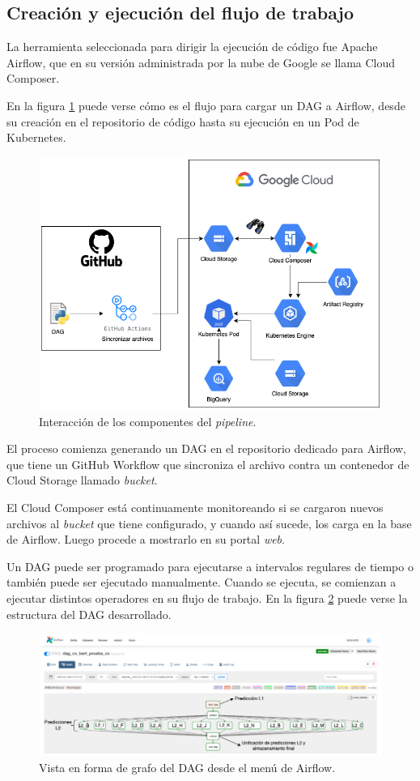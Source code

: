 \subsection{Creación y ejecución del flujo de trabajo}

La herramienta seleccionada para dirigir la ejecución de código fue Apache Airflow, que en su versión administrada por la nube de Google se llama Cloud Composer.

En la figura \ref{fig:cap3-pipeline} puede verse cómo es el flujo para cargar un DAG a Airflow, desde su creación en el repositorio de código hasta su ejecución en un Pod de Kubernetes.

\begin{figure}[htbp]
	\centering
	\includegraphics[width=.8\textwidth]{./Figures/cap3-pipeline.png}
	\caption{Interacción de los componentes del \textit{pipeline}.}
	\label{fig:cap3-pipeline}
\end{figure}

El proceso comienza generando un DAG en el repositorio dedicado para Airflow, que tiene un GitHub Workflow que sincroniza el archivo contra un contenedor de Cloud Storage llamado \textit{bucket}. 

El Cloud Composer está continuamente monitoreando si se cargaron nuevos archivos al \textit{bucket} que tiene configurado, y cuando así sucede, los carga en la base de Airflow. Luego procede a mostrarlo en su portal \textit{web}.

Un DAG puede ser programado para ejecutarse a intervalos regulares de tiempo o también puede ser ejecutado manualmente. Cuando se ejecuta, se comienzan a ejecutar distintos operadores en su flujo de trabajo. En la figura \ref{fig:cap3-dag} puede verse la estructura del DAG desarrollado.

\begin{figure}[H]
	\centering
	\includegraphics[width=1\textwidth]{./Figures/cap3-dag.png}
	\caption{Vista en forma de grafo del DAG desde el menú de Airflow.}
	\label{fig:cap3-dag}
\end{figure}


